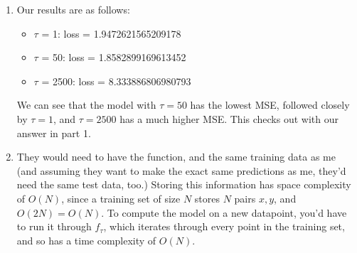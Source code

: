 \documentclass[submit]{harvardml}
\begin{document}
\begin{enumerate}
\item
    Our results are as follows:
    \begin{itemize}
        \item $\tau$ = 1: loss = 1.9472621565209178
        \item $\tau$ = 50: loss = 1.8582899169613452
        \item $\tau$ = 2500: loss = 8.333886806980793
    \end{itemize}
    We can see that the model with $\tau = 50$ has the lowest MSE, followed closely by $\tau=1$, and $\tau = 2500$ has a much higher MSE. This checks out with our answer in part 1.

\item
    They would need to have the function, and the same training data as me (and assuming they want to make the exact same predictions as me, they'd need the same test data, too.) Storing this information has space complexity of $O(N)$, since a training set of size $N$ stores $N$ pairs $x,y$, and $O(2N) = O(N)$. To compute the model on a new datapoint, you'd have to run it through $f_\tau$, which iterates through every point in the training set, and so has a time complexity of $O(N)$.
\end{enumerate}

\newpage

\end{document}
